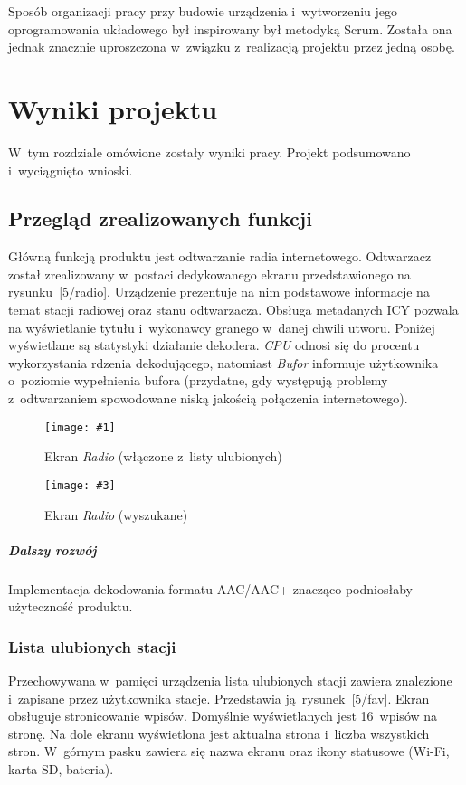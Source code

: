 \documentclass[polish]{aghengthesis}
\newcommand{\imgintss}[5]{
	\begin{figure}[{#5}]
		\centering
		\begin{minipage}{.45\textwidth}
			\centering
			\texttt{[image: \#1]}
			\caption{#2}
			\label{#1}
		\end{minipage}%
		\hfill
		\begin{minipage}{.45\textwidth}
			\centering
			\texttt{[image: \#3]}
			\caption{#4}
			\label{#3}
		\end{minipage}
	\end{figure}
}
\newcommand{\imghss}[4]{\imgintss{#1}{#2}{#3}{#4}{H}}
\begin{document}
		Sposób organizacji pracy przy budowie urządzenia i~wytworzeniu jego oprogramowania układowego był  inspirowany był metodyką Scrum. Została ona jednak znacznie uproszczona w~związku z~realizacją projektu przez jedną osobę.
	 	
\cleardoublepage
\chapter{Wyniki projektu}
	W~tym rozdziale omówione zostały wyniki pracy.
	Projekt podsumowano i~wyciągnięto wnioski.
	
	\section{Przegląd zrealizowanych funkcji}
		Główną funkcją produktu jest odtwarzanie radia internetowego. Odtwarzacz został zrealizowany w~postaci dedykowanego ekranu przedstawionego na rysunku~\ref{5/radio}. Urządzenie prezentuje na nim podstawowe informacje na temat stacji radiowej oraz stanu odtwarzacza. Obsługa metadanych ICY pozwala na wyświetlanie tytułu i~wykonawcy granego w~danej chwili utworu. Poniżej wyświetlane są statystyki działanie dekodera. \textit{CPU} odnosi się do procentu wykorzystania rdzenia dekodującego, natomiast \textit{Bufor} informuje użytkownika o~poziomie wypełnienia bufora (przydatne, gdy występują problemy z~odtwarzaniem spowodowane niską jakością połączenia internetowego).
		
		\imghss{5/radio}{Ekran \textit{Radio} (włączone z~listy ulubionych)}{5/radio_search}{Ekran \textit{Radio} (wyszukane)}
	
		\paragraph{Dalszy rozwój}
			Implementacja dekodowania formatu AAC/AAC+ znacząco podniosłaby użyteczność produktu.
			
		\subsection{Lista ulubionych stacji}
			Przechowywana w~pamięci urządzenia lista ulubionych stacji zawiera znalezione i~zapisane przez użytkownika stacje. Przedstawia ją rysunek~\ref{5/fav}.
			Ekran obsługuje stronicowanie wpisów. Domyślnie wyświetlanych jest 16~wpisów na stronę. Na dole ekranu wyświetlona jest aktualna strona i~liczba wszystkich stron.
			W~górnym pasku zawiera się nazwa ekranu oraz ikony statusowe (Wi-Fi, karta SD, bateria).
			
\end{document}
